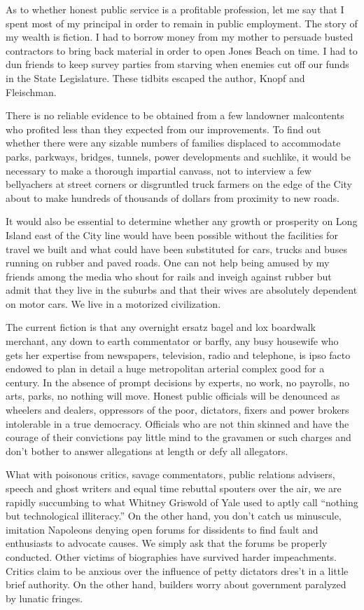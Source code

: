 \documentclass[11pt,letterpaper]{article}
\begin{document}
As to whether honest public service is a profitable profession, let me say that I spent most of my principal in order to remain in public employment. The story of my wealth is fiction. I had to borrow money from my mother to persuade busted contractors to bring back material in order to open Jones Beach on time. I had to dun friends to keep survey parties from starving when enemies cut off our funds in the State Legislature. These tidbits escaped the author, Knopf and Fleischman.

There is no reliable evidence to be obtained from a few landowner malcontents who profited less than they expected from our improvements. To find out whether there were any sizable numbers of families displaced to accommodate parks, parkways, bridges, tunnels, power developments and suchlike, it would be necessary to make a thorough impartial canvass, not to interview a few bellyachers at street corners or disgruntled truck farmers on the edge of the City about to make hundreds of thousands of dollars from proximity to new roads.

It would also be essential to determine whether any growth or prosperity on Long Island east of the City line would have been possible without the facilities for travel we built and what could have been substituted for cars, trucks and buses running on rubber and paved roads. One can not help being amused by my friends among the media who shout for rails and inveigh against rubber but admit that they live in the suburbs and that their wives are absolutely dependent on motor cars. We live in a motorized civilization.

The current fiction is that any overnight ersatz bagel and lox boardwalk merchant, any down to earth commentator or barfly, any busy housewife who gets her expertise from newspapers, television, radio and telephone, is ipso facto endowed to plan in detail a huge metropolitan arterial complex good for a century. In the absence of prompt decisions by experts, no work, no payrolls, no arts, parks, no nothing will move. Honest public officials will be denounced as wheelers and dealers, oppressors of the poor, dictators, fixers and power brokers intolerable in a true democracy. Officials who are not thin skinned and have the courage of their convictions pay little mind to the gravamen or such charges and don't bother to answer allegations at length or defy all allegators.

What with poisonous critics, savage commentators, public relations advisers, speech and ghost writers and equal time rebuttal spouters over the air, we are rapidly succumbing to what Whitney Griswold of Yale used to aptly call \enquote{nothing but technological illiteracy.} On the other hand, you don't catch us minuscule, imitation Napoleons denying open forums for dissidents to find fault and enthusiasts to advocate causes. We simply ask that the forums be properly conducted. Other victims of biographies have survived harder impeachments. Critics claim to be anxious over the influence of petty dictators dres't in a little brief authority. On the other hand, builders worry about government paralyzed by lunatic fringes.
\end{document}
